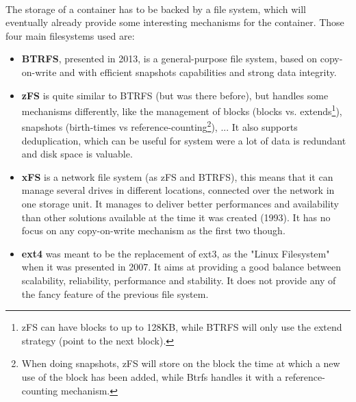 \paragraph{}The storage of a container has to be backed by a file system, which will eventually already provide some interesting mechanisms for the container.  Those four main filesystems used are:
\begin{itemize}
\renewcommand\labelitemi{--}
  \item \textbf{BTRFS}, presented in 2013, \cite{rodeh2013btrfs} is a general-purpose file system, based on copy-on-write and with efficient snapshots capabilities and strong data integrity.
  \item \textbf{zFS} is quite similar to BTRFS (but was there before), but handles some mechanisms differently, like the management of blocks (blocks vs. extends\footnote{zFS can have blocks to up to 128KB, while BTRFS will only use the extend strategy (point to the next block).}), snapshots (birth-times vs reference-counting\footnote{When doing snapshots, zFS will store on the block the time at which a new use of the block has been added, while Btrfs handles it with a reference-counting mechanism.}), ...  It also supports deduplication, which can be useful for system were a lot of data is redundant and disk space is valuable.
  \item \textbf{xFS} is a network file system (as zFS and BTRFS), this means that it can manage several drives in different locations, connected over the network in one storage unit.  It manages to deliver better performances and availability than other solutions available at the time it was created (1993).\cite{wang1993xfs}  It has no focus on any copy-on-write mechanism as the first two though.
  \item \textbf{ext4} was meant to be the replacement of ext3, as the "Linux Filesystem" when it was presented in 2007. \cite{mathur2007new}  It aims at providing a good balance between scalability, reliability, performance and stability.  It does not provide any of the fancy feature of the previous file system.
\end{itemize}

